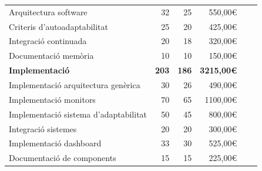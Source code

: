 \begin{table}[htb]
{\begin{tabular}{lrrrrr}
Arquitectura software                        & 32                                           & 25                                           & 550,00\euro                                        \\
Criteris d'autoadaptabilitat                 & 25                                           & 20                                            & 425,00\euro                                        \\
Integració continuada                        & 20                                           & 18                                             & 320,00\euro                                       \\
Documentació memòria                         & 10                                           & 10                                           & 150,00\euro                                        \\
\hline
\textbf{Implementació}                       & \textbf{203}                                 & \textbf{186}                                 & \textbf{3215,00\euro}                              \\
\hline
Implementació arquitectura genèrica                       & 30                                           & 26                                           & 490,00\euro                                        \\
Implementació monitors                       & 70                                           & 65                                            & 1100,00\euro                                        \\
Implementació sistema d'adaptabilitat                      & 50                                           & 45                                           & 800,00\euro                                        \\
Integració sistemes                      & 20                                           & 20                                             & 300,00\euro                                        \\
Implementació dashboard                      & 33                                           & 30                                           & 525,00\euro                                        \\
Documentació de components                   & 15                                           & 15                                             & 225,00\euro                                        \\

\end{tabular}}
\end{table}
